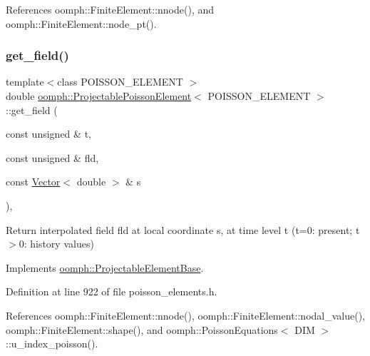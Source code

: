 References oomph\+::\+Finite\+Element\+::nnode(), and oomph\+::\+Finite\+Element\+::node\+\_\+pt().

\mbox{\label{classoomph_1_1ProjectablePoissonElement_a39f08edb4ea9e6c4e0def984cee288c6}} 
\subsubsection{\texorpdfstring{get\+\_\+field()}{get\_field()}}
{\footnotesize\ttfamily template$<$class P\+O\+I\+S\+S\+O\+N\+\_\+\+E\+L\+E\+M\+E\+NT $>$ \\
double \hyperlink{classoomph_1_1ProjectablePoissonElement}{oomph\+::\+Projectable\+Poisson\+Element}$<$ P\+O\+I\+S\+S\+O\+N\+\_\+\+E\+L\+E\+M\+E\+NT $>$\+::get\+\_\+field (\begin{DoxyParamCaption}\item[{const unsigned \&}]{t,  }\item[{const unsigned \&}]{fld,  }\item[{const \hyperlink{classoomph_1_1Vector}{Vector}$<$ double $>$ \&}]{s }\end{DoxyParamCaption})\hspace{0.3cm}{\ttfamily [inline]}, {\ttfamily [virtual]}}



Return interpolated field fld at local coordinate s, at time level t (t=0\+: present; t$>$0\+: history values) 



Implements \hyperlink{classoomph_1_1ProjectableElementBase_ae4da5b565b6d333be2f5920f7be763cd}{oomph\+::\+Projectable\+Element\+Base}.



Definition at line 922 of file poisson\+\_\+elements.\+h.



References oomph\+::\+Finite\+Element\+::nnode(), oomph\+::\+Finite\+Element\+::nodal\+\_\+value(), oomph\+::\+Finite\+Element\+::shape(), and oomph\+::\+Poisson\+Equations$<$ D\+I\+M $>$\+::u\+\_\+index\+\_\+poisson().

\mbox{\label{classoomph_1_1ProjectablePoissonElement_a0fa8292f5be360a3c8727cb1790506aa}} 
